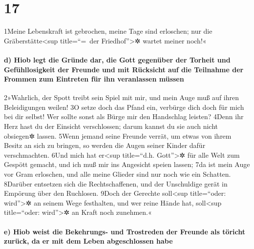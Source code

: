 \hypertarget{section-16}{%
\section{17}\label{section-16}}

1Meine Lebenskraft ist gebrochen, meine Tage sind erloschen; nur die
Gräberstätte\textless sup title=``=~der Friedhof''\textgreater✲ wartet
meiner noch!«

\hypertarget{d-hiob-legt-die-gruxfcnde-dar-die-gott-gegenuxfcber-der-torheit-und-gefuxfchllosigkeit-der-freunde-und-mit-ruxfccksicht-auf-die-teilnahme-der-frommen-zum-eintreten-fuxfcr-ihn-veranlassen-muxfcssen}{%
\paragraph{d) Hiob legt die Gründe dar, die Gott gegenüber der Torheit
und Gefühllosigkeit der Freunde und mit Rücksicht auf die Teilnahme der
Frommen zum Eintreten für ihn veranlassen
müssen}\label{d-hiob-legt-die-gruxfcnde-dar-die-gott-gegenuxfcber-der-torheit-und-gefuxfchllosigkeit-der-freunde-und-mit-ruxfccksicht-auf-die-teilnahme-der-frommen-zum-eintreten-fuxfcr-ihn-veranlassen-muxfcssen}}

2»Wahrlich, der Spott treibt sein Spiel mit mir, und mein Auge muß auf
ihren Beleidigungen weilen! 3O setze doch das Pfand ein, verbürge dich
doch für mich bei dir selbst! Wer sollte sonst als Bürge mir den
Handschlag leisten? 4Denn ihr Herz hast du der Einsicht verschlossen;
darum kannst du sie auch nicht obsiegen✲ lassen. 5Wenn jemand seine
Freunde verrät, um etwas von ihrem Besitz an sich zu bringen, so werden
die Augen seiner Kinder dafür verschmachten. 6Und mich hat
er\textless sup title=``d.h. Gott''\textgreater✲ für alle Welt zum
Gespött gemacht, und ich muß mir ins Angesicht speien lassen; 7da ist
mein Auge vor Gram erloschen, und alle meine Glieder sind nur noch wie
ein Schatten. 8Darüber entsetzen sich die Rechtschaffenen, und der
Unschuldige gerät in Empörung über den Ruchlosen. 9Doch der Gerechte
soll\textless sup title=``oder: wird''\textgreater✲ an seinem Wege
festhalten, und wer reine Hände hat, soll\textless sup title=``oder:
wird''\textgreater✲ an Kraft noch zunehmen.«

\hypertarget{e-hiob-weist-die-bekehrungs--und-trostreden-der-freunde-als-tuxf6richt-zuruxfcck-da-er-mit-dem-leben-abgeschlossen-habe}{%
\paragraph{e) Hiob weist die Bekehrungs- und Trostreden der Freunde als
töricht zurück, da er mit dem Leben abgeschlossen
habe}\label{e-hiob-weist-die-bekehrungs--und-trostreden-der-freunde-als-tuxf6richt-zuruxfcck-da-er-mit-dem-leben-abgeschlossen-habe}}

